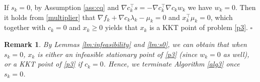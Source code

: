 \documentclass[11pt]{article}
\newtheorem{remark}{Remark}
\newenvironment{proof}{{\noindent\it Proof.}\quad}{\hfill $\square$\par}
\def\red#1{\textcolor{red}{#1}}
\newcommand{\R}{\mathbb{R}}
\newcommand{\be}{\begin{equation}}
\newcommand{\ee}{\end{equation}}
\newtheorem{lemma}{Lemma}
\begin{document}
\begin{proof}
    If \(s_k = 0\), by Assumption \ref{ass:cq} and $\nabla c_k^\top s=-\nabla c_k^\top \nabla c_k w_k$ we have $w_k=0$. Then it holds from \eqref{multiplier} that \(\nabla f_k + \nabla c_k \lambda_k - \mu_k = 0\) and \(x_k^\top \mu_k = 0\), which together with \(c_k = 0\) and \(x_k \geq 0\) yields that \(x_k\) is a KKT point of problem \eqref{p3}. 
\end{proof}

\begin{remark}
By Lemmas \ref{lm:infeasibility} and \ref{lm:s0}, we can obtain that when  $s_k=0$, $x_k$ is 
either an infeasible stationary point of \eqref{p3} (since $w_k=0$ as well), or 
a KKT point of \eqref{p3} if \(c_k=0\). Hence, we terminate  Algorithm \ref{alg3} once $s_k=0$.
\end{remark}



\end{document}
